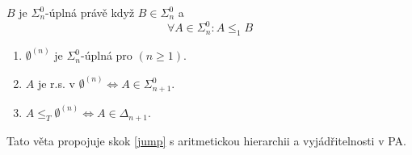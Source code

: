 \begin{definition}
	$B$ je $\Sigma_n^0$-úplná právě když $B \in \Sigma_n^0$ a
	\[ \forall A \in \Sigma_n^0: A \leq_1 B \]
\end{definition}

\begin{theorem}
	\begin{enumerate}
		\item $\emptyset^{(n)}$ je $\Sigma_n^0$-úplná pro $(n \geq 1)$.
		\item $A$ je r.s. v $\emptyset^{(n)} \iff A \in \Sigma_{n + 1}^0$.
		\item $A \leq_T \emptyset^{(n)} \iff A \in \Delta_{n + 1}$.
	\end{enumerate}

	Tato věta propojuje skok \cref{jump} s aritmetickou hierarchii a vyjádřitelnosti v PA.
\end{theorem}

